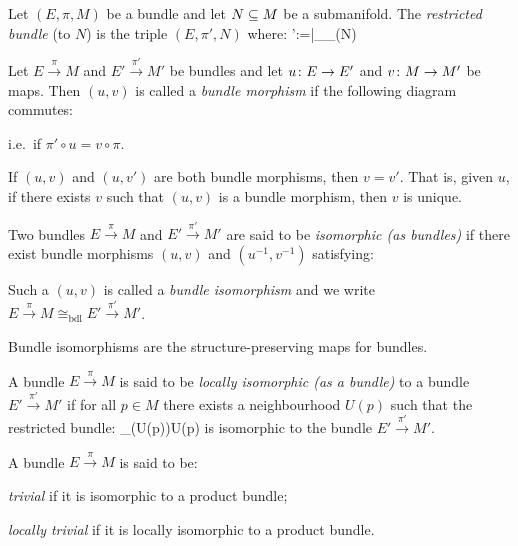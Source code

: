 \bd
Let $(E,\pi,M)$ be a bundle and let $N\subseteq M$ be a submanifold. The \emph{restricted bundle} (to $N$) is the triple $(E,\pi',N)$ where:
\bse
\pi':=\pi|_{_\pi(N)}
\ese
\ed

\bd
Let $E\xrightarrow{\,\pi\,}M$ and $E'\xrightarrow{\,\pi'\,}M'$ be bundles and let $u\colon E\to E'$ and $v\colon M\to M'$ be maps. Then $(u,v)$ is called a \emph{bundle morphism} if the following diagram commutes:
\bse
{}
\ese
i.e.\ if $\pi'\circ u = v \circ \pi$.
\ed

If $(u,v)$ and $(u,v')$ are both bundle morphisms, then $v=v'$. That is, given $u$, if there exists $v$ such that $(u,v)$ is a bundle morphism, then $v$ is unique.

\bd
Two bundles $E\xrightarrow{\,\pi\,}M$ and $E'\xrightarrow{\,\pi'\,}M'$ are said to be \emph{isomorphic (as bundles)} if there exist bundle morphisms $(u,v)$ and $(u^{-1},v^{-1})$ satisfying:
\bse
{}
\ese
Such a $(u,v)$ is called a \emph{bundle isomorphism} and we write $E\xrightarrow{\,\pi\,}M  \cong_{\mathrm{bdl}} E'\xrightarrow{\,\pi'\,}M'$.
\ed

Bundle isomorphisms are the structure-preserving maps for bundles.

\bd
A bundle $E\xrightarrow{\,\pi\,}M$ is said to be \emph{locally isomorphic (as a bundle)} to a bundle $E'\xrightarrow{\,\pi'\,}M'$ if for all $p\in M$ there exists a neighbourhood $U(p)$ such that the restricted bundle:
\bse
{}_\pi(U(p))U(p)
\ese
is isomorphic to the bundle $E'\xrightarrow{\,\pi'\,}M'$.
\ed

\bd
A bundle $E\xrightarrow{\,\pi\,}M$ is said to be:
\ben
\item[i)] \emph{trivial} if it is isomorphic to a product bundle;
\item[ii)] \emph{locally trivial} if it is locally isomorphic to a product bundle.
\een
\ed

